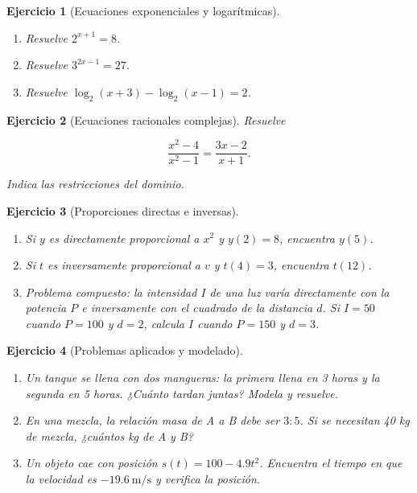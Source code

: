\documentclass[12pt]{article}
\newtheorem{exercise}{Ejercicio}
\begin{document}
\begin{exercise}[Ecuaciones exponenciales y logarítmicas]
\begin{enumerate}[label=(\alph*)]
  \item Resuelve \(2^{x+1} = 8\).
  \item Resuelve \(3^{2x-1} = 27\).
  \item Resuelve \(\log_2(x+3) - \log_2(x-1) = 2\).
\end{enumerate}
\end{exercise}

\begin{exercise}[Ecuaciones racionales complejas]
Resuelve


\[
\frac{x^2-4}{x^2-1} = \frac{3x-2}{x+1}.
\]


Indica las restricciones del dominio.
\end{exercise}

\begin{exercise}[Proporciones directas e inversas]
\begin{enumerate}[label=(\alph*)]
  \item Si \(y\) es directamente proporcional a \(x^2\) y \(y(2)=8\), encuentra \(y(5)\).
  \item Si \(t\) es inversamente proporcional a \(v\) y \(t(4)=3\), encuentra \(t(12)\).
  \item Problema compuesto: la intensidad \(I\) de una luz varía directamente con la potencia \(P\) e inversamente con el cuadrado de la distancia \(d\). Si \(I=50\) cuando \(P=100\) y \(d=2\), calcula \(I\) cuando \(P=150\) y \(d=3\).
\end{enumerate}
\end{exercise}

\begin{exercise}[Problemas aplicados y modelado]
\begin{enumerate}[label=(\alph*)]
  \item Un tanque se llena con dos mangueras: la primera llena en 3 horas y la segunda en 5 horas. ¿Cuánto tardan juntas? Modela y resuelve.
  \item En una mezcla, la relación masa de A a B debe ser \(3:5\). Si se necesitan 40 kg de mezcla, ¿cuántos kg de A y B?
  \item Un objeto cae con posición \(s(t)=100-4.9t^2\). Encuentra el tiempo en que la velocidad es \(-19.6\ \mathrm{m/s}\) y verifica la posición.
\end{enumerate}
\end{exercise}
\end{document}
